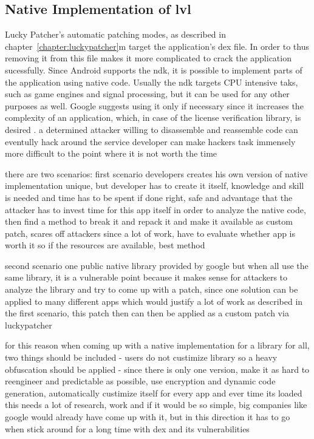 \subsection{Native Implementation of \gls{lvl}} \label{subsection:counter-modifications-dynamic}

Lucky Patcher's automatic patching modes, as described in chapter~\ref{chapter:luckypatcher}m target the application's \gls{dex} file.
In order to  thus removing it from this file makes it more complicated to crack the application sucessfully.
Since Android supports the \gls{ndk}, it is possible to implement parts of the application using native code.
Usually the \gls{ndk} targets CPU intensive taks, such as game engines and signal processing, but it can be used for any other purposes as well.
Google suggests using it only if necessary since it increases the complexity of an application, which, in case of the license verification library, is desired \cite{androidNdk}.
a determined attacker willing to disassemble and reassemble code can eventully hack around the service\cite{developersSecuring}
developer can make hackers task immensely more difficult to the point where it is not worth the time\cite{developersSecuring}


there are two scenarios:
first scenario
developers creates his own version of native implementation
unique, but developer has to create it itself, knowledge and skill is needed and time has to be spent
if done right, safe and advantage that the attacker has to invest time for this app itself in order to analyze the native code, then find a method to break it and repack it and make it available as custom patch, scares off attackers since a lot of work, have to evaluate whether app is worth it
so if the resources are available, best method

second scenario
one public native library provided by google
but when all use the same library, it is a vulnerable point because it makes sense for attackers to analyze the library and try to come up with a patch, since one solution can be applied to many different apps which would justify a lot of work as described in the first scenario, this patch then can then be applied as a custom patch via luckypatcher

for this reason when coming up with a native implementation for a library for all, two things should be included
- users do not custimize library so a heavy obfuscation should be applied
- since there is only one version, make it as hard to reengineer and predictable as possible, use encryption and dynamic code generation, automatically custimize itself for every app and ever time its loaded
this needs a lot of research, work and if it would be so simple, big companies like google would already have come up with it, but in this direction it has to go when stick around for a long time with dex and its vulnerabilities


